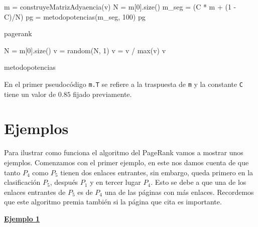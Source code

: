 \documentclass[size=a4, parskip=half, titlepage=false, toc=flat, toc=bib, 12pt]{scrartcl}
\theoremstyle{theorem-style}
\theoremstyle{definition-style}
\theoremstyle{remark-style}
\theoremstyle{example-style}
\theoremstyle{definition-style}
\theoremstyle{remark-style}
\begin{document}
\begin{algorithm}[H]
  m = construyeMatrizAdyaencia(v)\;
  N = m[0].size()\;
  m\_seg = (C * m + (1 - C)/N)\;
  pg = metodopotencias(m\_seg, 100)\;
  \Return pg
\caption{pagerank}
\end{algorithm}

\begin{algorithm}[H]

  N = m[0].size()\;
  v = random(N, 1)\;
  v = v / max(v)\;
  \Return v

\caption{metodopotencias}
\end{algorithm}

En el primer pseudocódigo \verb|m.T| se refiere a la traspuesta de \verb|m| y la constante \verb|C| tiene un valor de $0.85$ fijado previamente.

\newpage

\section{Ejemplos}
Para ilustrar como funciona el algoritmo del PageRank vamos a mostrar unos ejemplos. Comenzamos con el primer ejemplo, en este nos damos cuenta de que tanto $P_4$ como $P_5$ tienen dos enlaces entrantes, sin embargo, queda primero en la clasificación $P_5$, después $P_1$ y en tercer lugar $P_4$. Esto se debe a que una de los enlaces entrantes de $P_5$ es de $P_4$ una de las páginas con más enlaces. Recordemos que este algoritmo premia también si la página que cita es importante.

\underline{\textbf{Ejemplo 1}}
\end{document}

